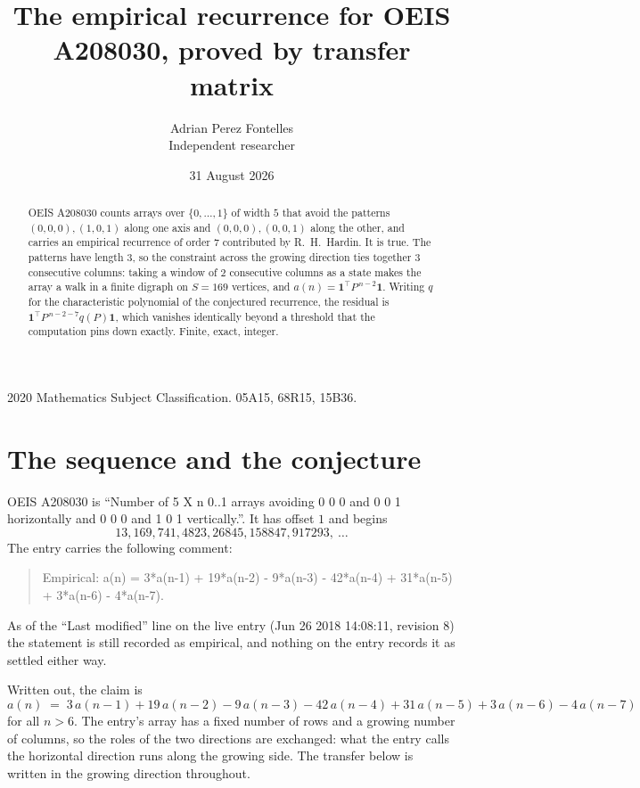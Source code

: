\documentclass[11pt,a4paper]{article}
\title{The empirical recurrence for OEIS A208030, proved by transfer matrix}
\author{Adrian Perez Fontelles\\ \small Independent researcher}
\date{31 August 2026}
\theoremstyle{plain}
\theoremstyle{definition}
\begin{document}
\maketitle

\begin{abstract}
OEIS A208030 counts arrays over $\{0,\dots,1\}$ of width $5$ that avoid the patterns
$(0,0,0), (1,0,1)$ along one axis and $(0,0,0), (0,0,1)$ along the other, and carries an empirical recurrence of
order $7$ contributed by R.~H.~Hardin. It is true. The patterns have length $3$, so
the constraint across the growing direction ties together $3$ consecutive columns: taking a
window of $2$ consecutive columns as a state makes the array a walk in a finite digraph
on $S=169$ vertices, and $a(n)=\mathbf{1}^{\!\top}P^{\,n-2}\mathbf{1}$. Writing $q$
for the characteristic polynomial of the conjectured recurrence, the residual is
$\mathbf{1}^{\!\top}P^{\,n-2-7}q(P)\mathbf{1}$, which vanishes identically
beyond a threshold that the computation pins down exactly. Finite, exact, integer.
\end{abstract}

\noindent\small 2020 Mathematics Subject Classification. 05A15, 68R15, 15B36.\normalsize

\section{The sequence and the conjecture}

OEIS A208030 is ``Number of 5 X n 0..1 arrays avoiding 0 0 0 and 0 0 1 horizontally and 0 0 0 and 1 0 1 vertically.''. It has offset
$1$ and begins
\[
13, 169, 741, 4823, 26845, 158847, 917293,\ \dots
\]
The entry carries the following comment:
\begin{quote}\small
Empirical: a(n) = 3*a(n-1) + 19*a(n-2) - 9*a(n-3) - 42*a(n-4) + 31*a(n-5) + 3*a(n-6) - 4*a(n-7).
\end{quote}
As of the ``Last modified'' line on the live entry (Jun 26 2018 14:08:11, revision
8) the statement is still recorded as empirical, and nothing on the entry
records it as settled either way.

Written out, the claim is
\begin{equation}\label{eq:conj}
a(n)\;=\;3\,a(n-1) + 19\,a(n-2) - 9\,a(n-3) - 42\,a(n-4) + 31\,a(n-5) + 3\,a(n-6) - 4\,a(n-7)
\end{equation}
for all $n>6$. The entry's array has a fixed number of rows and a growing number of
columns, so the roles of the two directions are exchanged: what the entry calls the
horizontal direction runs along the growing side. The transfer below is written in the
growing direction throughout.
\end{document}
